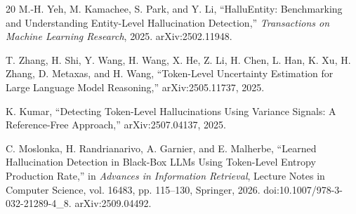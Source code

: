 \documentclass[11pt]{article}
\begin{document}
\begin{thebibliography}{20}
M.-H. Yeh, M. Kamachee, S. Park, and Y. Li,
``HalluEntity: Benchmarking and Understanding Entity-Level Hallucination Detection,''
\textit{Transactions on Machine Learning Research}, 2025.
arXiv:2502.11948.

T. Zhang, H. Shi, Y. Wang, H. Wang, X. He, Z. Li, H. Chen,
L. Han, K. Xu, H. Zhang, D. Metaxas, and H. Wang,
``Token-Level Uncertainty Estimation for Large Language Model Reasoning,''
arXiv:2505.11737, 2025.

K. Kumar,
``Detecting Token-Level Hallucinations Using Variance Signals:
A Reference-Free Approach,''
arXiv:2507.04137, 2025.

C. Moslonka, H. Randrianarivo, A. Garnier, and E. Malherbe,
``Learned Hallucination Detection in Black-Box LLMs Using Token-Level
Entropy Production Rate,''
in \textit{Advances in Information Retrieval},
Lecture Notes in Computer Science, vol. 16483, pp. 115--130,
Springer, 2026.
doi:10.1007/978-3-032-21289-4\_8.
arXiv:2509.04492.

\end{thebibliography}
\end{document}
